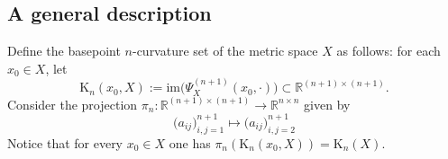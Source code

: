 \documentclass[a4paper,12pt,reqno, english]{amsart}
\newcommand{\dB}{d_{\mathrm{B}}}
\newcommand{\cset}{\mathrm{K}}
\newcommand{\dgm}{\mathrm{dgm}}
\newcommand{\R}{\mathbb{R}}
\newcommand{\M}{\mathcal{M}}
\theoremstyle{plain}
\theoremstyle{definition}
\newcommand{\facundo}[1]{\textcolor{red}{#1}}
\begin{document}


\subsection{A general description}
Define the basepoint $n$-curvature set of the metric space $X$ as follows: for each $x_0\in X$, let 
$$ \cset_n(x_0,X) :=  \mathrm{im}\big(\Psi^{(n+1)}_X(x_0,\cdot)\big) \subset \R^{(n+1)\times (n+1)}.$$
Consider the projection $\pi_n:\R^{(n+1)\times (n+1)}\rightarrow \R^{n\times n}$ given by 
$$\big(a_{ij}\big)_{i,j=1}^{n+1}\mapsto \big(a_{ij}\big)_{i,j=2}^{n+1}$$
Notice that for every $x_0\in X$ one has $\pi_n(\cset_n(x_0,X)) = \cset_n(X).$
\end{document}
